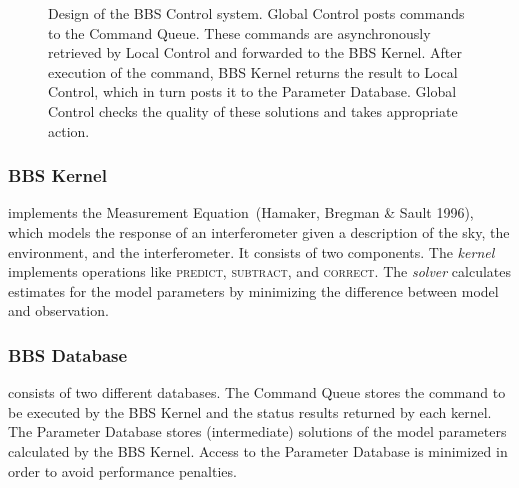 \documentclass[11pt,twoside]{article}  %
\begin{document}

\begin{figure}[!ht]
\caption{Design of the BBS Control system. Global Control posts commands
to the Command Queue. These commands are asynchronously retrieved by Local
Control and forwarded to the BBS Kernel. After execution of the command, BBS
Kernel returns the result to Local Control, which in turn posts it to the
Parameter Database. Global Control checks the quality of these solutions and
takes appropriate action.}
\label{fig:O4b.4_bbs-control-global-design}
\end{figure}

\subsubsection{BBS Kernel} implements the Measurement Equation~(Hamaker,
Bregman \& Sault 1996), which models the response of an interferometer given a
description of the sky, the environment, and the interferometer. It consists
of two components. The
\emph{kernel} implements operations like \textsc{predict}, \textsc{subtract},
and \textsc{correct}. The \emph{solver} calculates estimates for the model
parameters by minimizing the difference between model and observation.

\subsubsection{BBS Database} consists of two different databases. The Command
Queue stores the command to be executed by the BBS Kernel and the status
results returned by each kernel. The Parameter Database stores (intermediate)
solutions of the model parameters calculated by the BBS Kernel. Access to the
Parameter Database is minimized in order to avoid performance penalties. 

\end{document}
